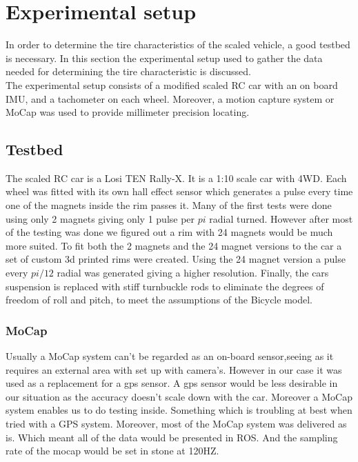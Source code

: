 \section{Experimental setup}
 

In order to determine the tire characteristics of the scaled vehicle, a good testbed is necessary. In this section the experimental setup used to gather the data needed for determining the tire characteristic is discussed.\\
The experimental setup consists of a modified scaled RC car with an on board IMU, and a tachometer on each wheel. Moreover, a motion capture system or MoCap was used to provide millimeter precision locating. 

\subsection{Testbed}
The scaled RC car is a Losi TEN Rally-X. It is a 1:10 scale car with 4WD.  
Each wheel was fitted with it\textquotesingle s own hall effect sensor which generates a pulse every time one of the magnets inside the rim passes it. Many of the first tests were done using only 2 magnets giving only 1 pulse per \(pi\) radial turned. However after most of the testing was done we figured out a rim with 24 magnets would be much more suited. To fit both the 2 magnets and the 24 magnet versions to the car a set of custom 3d printed rims were created. Using the 24 magnet version a pulse every \(pi/12\) radial was generated giving a higher resolution. Finally, the car\textquotesingle s suspension is replaced with stiff turnbuckle rods to eliminate the degrees of freedom of roll and pitch, to meet the assumptions of the Bicycle model.
\subsubsection{MoCap}
Usually a MoCap system can't be regarded as an \textquotesingle on-board sensor\textquotesingle ,seeing as it requires an external area with set up with camera's. However in our case it was used as a replacement for a gps sensor. A gps sensor would be less desirable in our situation as the accuracy doesn't scale down with the car. Moreover a MoCap system enables us to do testing inside. Something which is troubling at best when tried with a GPS system. Moreover, most of the MoCap system was delivered as is. Which meant all of the data would be presented in ROS. And the sampling rate of the mocap would be set in stone at 120HZ.

